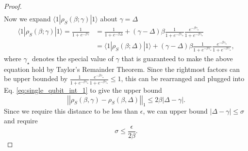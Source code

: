 \documentclass[
 amsmath,amssymb,
 aps,
onecolumn, 
nofootinbib]{revtex4-2}
\newcommand{\ket}[1]{|#1\rangle}
\newcommand{\bra}[1]{\langle #1|}
\newcommand{\norm}[1]{\left|\left| #1 \right|\right|}
\begin{document}
\begin{proof}
\begin{align}
 \end{align}
    Now we expand $\bra{1} \rho_S(\beta; \gamma) \ket{1}$ about $\gamma = \Delta$
    \begin{align}
    \bra{1} \rho_S(\beta; \gamma) \ket{1} = \frac{1}{1 + e^{-\beta \gamma}} &= \frac{1}{1 + e^{-\beta \Delta}} + (\gamma - \Delta) \beta \frac{1}{1 + e^{-\beta \gamma_{\star}}} \frac{e^{-\beta \gamma_{\star}}}{1 + e^{-\beta \gamma_{\star}}} \\
    &= \bra{1} \rho_S(\beta; \Delta) \ket{1} + (\gamma - \Delta) \beta \frac{1}{1 + e^{-\beta \gamma_{\star}}} \frac{e^{-\beta \gamma_{\star}}}{1 + e^{-\beta \gamma_{\star}}},
    \end{align}
    where $\gamma_{\star}$ denotes the special value of $\gamma$ that is guaranteed to make the above equation hold by Taylor's Remainder Theorem.
    Since the rightmost factors can be upper bounded by $\frac{1}{1 + e^{-\beta \gamma_{\star}}} \frac{e^{-\beta \gamma_{\star}}}{1 + e^{-\beta \gamma_{\star}}} \le 1$, this can be rearranged and plugged into Eq. \eqref{eq:single_qubit_int_1} to give the upper bound
 \begin{equation}
 \norm{\rho_S(\beta, \gamma) - \rho_S(\beta, \Delta)}_1 \le 2 \beta |\Delta - \gamma|.
 \end{equation}
Since we require this distance to be less than $\epsilon$, we can upper bound $|\Delta - \gamma| \le \sigma$ and require
\begin{equation}
    \sigma \le \frac{\epsilon}{2 \beta}. \label{eq:single_qubit_ineq_1}
\end{equation}


\end{proof}
\end{document}
